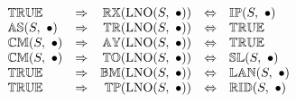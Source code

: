 \[
\begin{array}{lcrcl} 
{\mathbb{TRUE}}
	& \Rightarrow
	& {\mathbb{RX}}(\mathrm{LNO}(S,\ \bullet)) 
    & \Leftrightarrow
    & {\mathbb{IP}}(S,\ \bullet)  \\
{\mathbb{AS}}(S,\ \bullet)
	& \Rightarrow
	& {\mathbb{TR}}(\mathrm{LNO}(S,\ \bullet))
    & \Leftrightarrow
    & {\mathbb{TRUE}} \\
{\mathbb{CM}}(S,\ \bullet)
	& \Rightarrow
	& {\mathbb{AY}}(\mathrm{LNO}(S,\ \bullet))
    & \Leftrightarrow
    & {\mathbb{TRUE}} \\ 
{\mathbb{CM}}(S,\ \bullet)
	& \Rightarrow
	& {\mathbb{TO}}(\mathrm{LNO}(S,\ \bullet))
    & \Leftrightarrow
    & {\mathbb{SL}}(S,\ \bullet) \\
{\mathbb{TRUE}}
	& \Rightarrow
	& {\mathbb{BM}}(\mathrm{LNO}(S,\ \bullet))
    & \Leftrightarrow
    & {\mathbb{LAN}}(S,\ \bullet) \\ 
{\mathbb{TRUE}}
	& \Rightarrow
	& {\mathbb{TP}}(\mathrm{LNO}(S,\ \bullet))
    & \Leftrightarrow
    & {\mathbb{RID}}(S,\ \bullet) \\ 
\end{array} 
\] 
